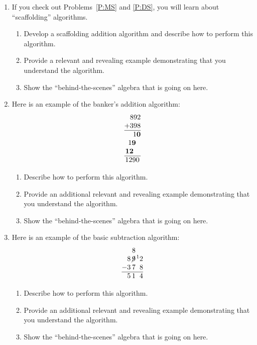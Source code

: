 \begin{problems}
\begin{enumerate}
\item If you check out Problems~\ref{P:MS} and \ref{P:DS}, you will
  learn about ``scaffolding'' algorithms.  
\begin{enumerate}
\item Develop a scaffolding addition algorithm and describe how to
  perform this algorithm.
\item Provide a relevant and revealing example demonstrating that you
  understand the algorithm.
\item Show the ``behind-the-scenes'' algebra that is going on here.
\end{enumerate}
\item Here is an example of the banker's addition
  algorithm:
\[
\begin{array}{@{}r@{}}
892\\
+398\\ \hline
1\textbf{0}\\
1\textbf{9}~~\\
\textbf{12}~~~\\ \hline
1290\,
\end{array}
\]
\begin{enumerate}
\item Describe how to perform this algorithm.
\item Provide an additional relevant and revealing example
  demonstrating that you understand the algorithm.
\item Show the ``behind-the-scenes'' algebra that is going on here.
\end{enumerate}
\item Here is an example of the basic subtraction
  algorithm:
\[
\begin{array}{@{}r@{}r@{}r@{}r@{}}
&   & 8 &  \\
& 8 & \not{\hspace{-.2ex}9} & \hspace{.3ex}\leftexp{1}2\\
- & 3 & 7 & 8\\ \hline
& 5 & 1 & 4
\end{array}
\]
\begin{enumerate}
\item Describe how to perform this algorithm.
\item Provide an additional relevant and revealing example
  demonstrating that you understand the algorithm.
\item Show the ``behind-the-scenes'' algebra that is going on here.

\end{enumerate}
\end{enumerate}
\end{problems}
